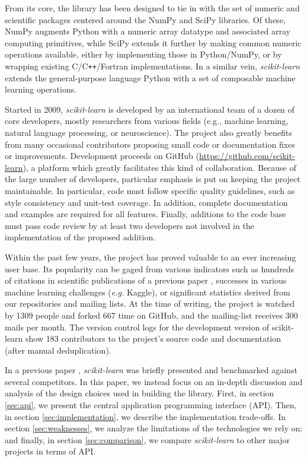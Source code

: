 \documentclass{llncs}
\newcommand{\sklearn}{\textit{scikit-learn}\xspace}
\begin{document}
From its core, the library has been designed to tie in with the set
of numeric and scientific packages centered around the NumPy and SciPy libraries.
Of these, NumPy \citep{vanderwalt2011} augments Python
with a numeric array datatype and associated array computing primitives,
while SciPy \citep{varoquaux2013scipy} extends it further
by making common numeric operations available,
either by implementing those in Python/NumPy,
or by wrapping existing C/C{}\verb!++!/Fortran implementations.
In a similar vein, \sklearn extends the general-purpose language Python
with a set of composable machine learning operations.

Started in 2009, \sklearn is developed by an international team
of a dozen of core developers, mostly researchers from various fields
(e.g., machine learning, natural language processing, or neuroscience).
The project also greatly benefits from many occasional
contributors proposing small code or documentation fixes or improvements.
Development proceeds on GitHub (\url{https://github.com/scikit-learn}),
a platform which greatly facilitates this kind of collaboration.
Because of the large number of developers,
particular emphasis is put on keeping the project maintainable.
In particular, code must follow specific
quality guidelines, such as style consistency and unit-test coverage. In
addition, complete documentation and examples are required for all
features.
Finally, additions to the code base must pass code review
by at least two developers not involved in the implementation
of the proposed addition.

Within the past few years, the project has proved valuable to an ever increasing
user base. Its popularity can be gaged from various indicators such as hundreds
of citations in scientific publications of a previous paper
\citep{pedregosa2011}, successes in various machine learning challenges
(\emph{e.g.} Kaggle), or significant statistics derived from our repositories
and mailing lists.  At the time of writing, the project is watched by 1309
people and forked 667 time on GitHub, and the mailing-list receives 300 mails
per month.
The version control logs for the development version of scikit-learn
show 183 contributors to the project's source code and documentation
(after manual deduplication).

In a previous paper \citep{pedregosa2011}, \sklearn was briefly presented and
benchmarked against several competitors. In this paper, we instead focus on an
in-depth discussion and analysis of the design choices used in
building the library. First, in section \ref{sec:api}, we present the
central application programming interface (API). Then, in section
\ref{sec:implementation}, we describe the implementation trade-offs.
In section \ref{sec:weaknesses}, we analyze the limitations of the
technologies we rely on; and finally, in section \ref{sec:comparison}, we
compare \emph{scikit-learn} to other major projects in terms of API.
\end{document}
